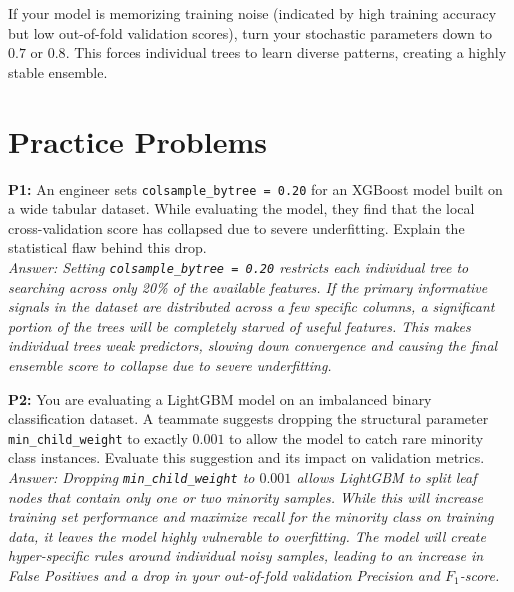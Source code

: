 \documentclass{article}
\begin{document}
\begin{tcolorbox}[colback=green!5!white,colframe=green!70!black,title=The Generalization Commandment]
If your model is memorizing training noise (indicated by high training accuracy but low out-of-fold validation scores), turn your stochastic parameters down to $0.7$ or $0.8$. This forces individual trees to learn diverse patterns, creating a highly stable ensemble.
\end{tcolorbox}

\newpage
\section{Practice Problems}

\textbf{P1:} An engineer sets \texttt{colsample\_bytree = 0.20} for an XGBoost model built on a wide tabular dataset. While evaluating the model, they find that the local cross-validation score has collapsed due to severe underfitting. Explain the statistical flaw behind this drop.
\\
\textit{Answer: Setting \texttt{colsample\_bytree = 0.20} restricts each individual tree to searching across only 20\% of the available features. If the primary informative signals in the dataset are distributed across a few specific columns, a significant portion of the trees will be completely starved of useful features. This makes individual trees weak predictors, slowing down convergence and causing the final ensemble score to collapse due to severe underfitting.}

\newline
\textbf{P2:} You are evaluating a LightGBM model on an imbalanced binary classification dataset. A teammate suggests dropping the structural parameter \texttt{min\_child\_weight} to exactly $0.001$ to allow the model to catch rare minority class instances. Evaluate this suggestion and its impact on validation metrics.
\\
\textit{Answer: Dropping \texttt{min\_child\_weight} to $0.001$ allows LightGBM to split leaf nodes that contain only one or two minority samples. While this will increase training set performance and maximize recall for the minority class on training data, it leaves the model highly vulnerable to overfitting. The model will create hyper-specific rules around individual noisy samples, leading to an increase in False Positives and a drop in your out-of-fold validation Precision and $F_1$-score.}
\end{document}
